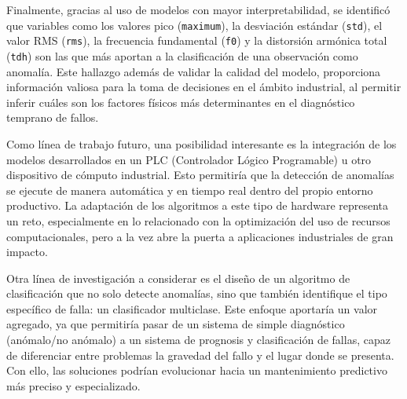 \documentclass[11pt,a4paper,spanish]{book}
\numberwithin{equation}{chapter}
\numberwithin{figure}{chapter}
\begin{document}
Finalmente, gracias al uso de modelos con mayor interpretabilidad, se identificó que 
variables como los valores pico (\lstinline|maximum|), la desviación estándar 
(\lstinline|std|), el valor RMS (\lstinline|rms|),
la frecuencia fundamental (\lstinline|f0|) y 
la distorsión armónica total (\lstinline|tdh|) son las que más 
aportan a la clasificación de una observación como anomalía. Este hallazgo  además de 
validar la calidad del modelo, proporciona información valiosa para la toma de 
decisiones en el ámbito industrial, al permitir inferir cuáles son los factores físicos
más determinantes en el diagnóstico temprano de fallos.


Como línea de trabajo futuro, una posibilidad interesante es la integración de los 
modelos desarrollados en un PLC (Controlador Lógico Programable) u otro dispositivo
de cómputo industrial. Esto permitiría que la detección de anomalías se ejecute de 
manera automática y en tiempo real dentro del propio entorno productivo. La adaptación
de los algoritmos a este tipo de hardware representa un reto, especialmente en lo 
relacionado con la optimización del uso de recursos computacionales, pero a la vez abre
la puerta a aplicaciones industriales de gran impacto.


Otra línea de investigación a considerar es el diseño de un algoritmo de clasificación
que no solo detecte anomalías, sino que también identifique el tipo específico de falla:
un clasificador multiclase.  Este enfoque aportaría un valor agregado, ya que permitiría
pasar de un sistema de simple diagnóstico (anómalo/no anómalo) a un sistema de prognosis
y clasificación de fallas, capaz de diferenciar entre problemas la gravedad del fallo y 
el lugar donde se presenta. Con ello, las soluciones podrían evolucionar hacia un 
mantenimiento predictivo más preciso y especializado.






\end{document}
